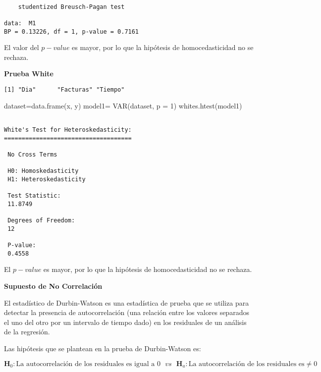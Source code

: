 \documentclass[
  a4paper,
  oneside,
  openany]{book}
\newenvironment{Shaded}{\begin{snugshade}}{\end{snugshade}}
\newcommand{\AttributeTok}[1]{\textcolor[rgb]{0.77,0.63,0.00}{#1}}
\newcommand{\DecValTok}[1]{\textcolor[rgb]{0.00,0.00,0.81}{#1}}
\newcommand{\FunctionTok}[1]{\textcolor[rgb]{0.00,0.00,0.00}{#1}}
\newcommand{\NormalTok}[1]{#1}
\newcommand{\OtherTok}[1]{\textcolor[rgb]{0.56,0.35,0.01}{#1}}
\begin{document}
\begin{verbatim}

    studentized Breusch-Pagan test

data:  M1
BP = 0.13226, df = 1, p-value = 0.7161
\end{verbatim}

El valor del \(p-value\) es mayor, por lo que la hipótesis de homocedasticidad no se rechaza.

\textbf{Prueba White}

\begin{verbatim}
[1] "Dia"      "Facturas" "Tiempo"  
\end{verbatim}

\begin{Shaded}
\begin{Highlighting}[]
\NormalTok{dataset}\OtherTok{=}\FunctionTok{data.frame}\NormalTok{(x, y)}
\NormalTok{model1}\OtherTok{=} \FunctionTok{VAR}\NormalTok{(dataset, }\AttributeTok{p =} \DecValTok{1}\NormalTok{)}
\FunctionTok{whites.htest}\NormalTok{(model1)}
\end{Highlighting}
\end{Shaded}

\begin{verbatim}

White's Test for Heteroskedasticity:
==================================== 

 No Cross Terms

 H0: Homoskedasticity
 H1: Heteroskedasticity

 Test Statistic:
 11.8749 

 Degrees of Freedom:
 12 

 P-value:
 0.4558 
\end{verbatim}

El \(p-value\) es mayor, por lo que la hipótesis de homocedasticidad no se rechaza.

\textbf{Supuesto de No Correlación}

El estadístico de Durbin-Watson es una estadística de prueba que se utiliza para detectar la presencia de autocorrelación (una relación entre los valores separados el uno del otro por un intervalo de tiempo dado) en los residuales de un análisis de la regresión.

Las hipótesis que se plantean en la prueba de Durbin-Watson es:

\[\textbf{H}_0: \mbox{La autocorrelación de los residuales es igual a } 0 \ \ \  vs \ \ \  \textbf{H}_a: \mbox{La autocorrelación de los residuales es} \neq 0\]
\end{document}

